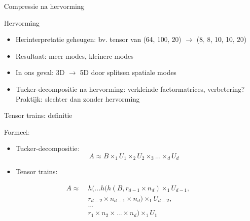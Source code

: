 \documentclass[t,12pt,dutch
\ifx\beamermode\undefined\else,\beamermode\fi
]{beamer}
\begin{document}
\begin{frame}{}
\begin{center}
\vspace*{\fill}
\vspace*{\fill}
\Huge
Compressie na hervorming
\normalsize
\vspace*{\fill}
\end{center}
\end{frame}

\begin{frame}{Hervorming}

\begin{itemize}
\item Herinterpretatie geheugen: bv. tensor van (64, 100, 20) $\rightarrow$ (8, 8, 10, 10, 20)
\item Resultaat: meer modes, kleinere modes
\item In ons geval: 3D $\rightarrow$ 5D door splitsen spatiale modes
\item Tucker-decompositie na hervorming: verkleinde factormatrices, verbetering?\\
Praktijk: slechter dan zonder hervorming
\end{itemize}

\end{frame}

\begin{frame}{Tensor trains: definitie}

Formeel:
\begin{itemize}
\item Tucker-decompositie:
\[
A \approx B \times_1 U_1 \times_2 U_2 \times_3 \dots \times_d U_d
\]
\item Tensor trains:
\end{itemize}

\begin{equation*}
\begin{split}
A \approx \; & h(\dots h(h(B, r_{d-1} \times n_d) \times_1 U_{d-1}, \\
& r_{d-2} \times n_{d-1} \times n_d) \times_1 U_{d-2}, \\
& \dots \\
& r_1 \times n_2 \times \dots \times n_d) \times_1 U_1
\end{split}
\end{equation*}

\end{frame}
\end{document}
